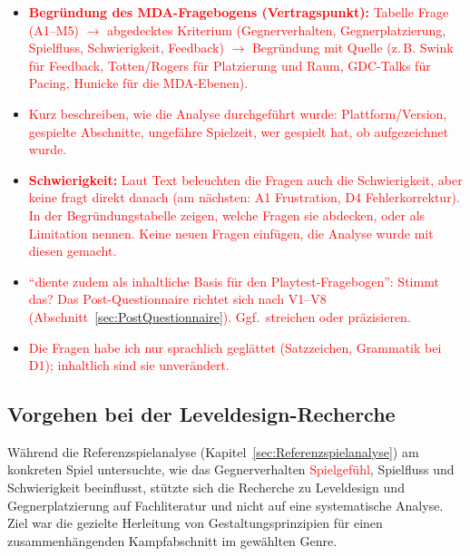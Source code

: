 \documentclass[../Main.tex]{subfiles}
\begin{document}
\begin{itemize}[leftmargin=1.5cm]
    \item \textcolor{red}{\textbf{Begründung des MDA-Fragebogens (Vertragspunkt):} Tabelle Frage (A1--M5) $\rightarrow$ abgedecktes Kriterium (Gegnerverhalten, Gegnerplatzierung, Spielfluss, Schwierigkeit, Feedback) $\rightarrow$ Begründung mit Quelle (z.\,B. Swink für Feedback, Totten/Rogers für Platzierung und Raum, GDC-Talks für Pacing, Hunicke für die MDA-Ebenen).}
    \item \textcolor{red}{Kurz beschreiben, wie die Analyse durchgeführt wurde: Plattform/Version, gespielte Abschnitte, ungefähre Spielzeit, wer gespielt hat, ob aufgezeichnet wurde.}
    \item \textcolor{red}{\textbf{Schwierigkeit:} Laut Text beleuchten die Fragen auch die Schwierigkeit, aber keine fragt direkt danach (am nächsten: A1 Frustration, D4 Fehlerkorrektur). In der Begründungstabelle zeigen, welche Fragen sie abdecken, oder als Limitation nennen. Keine neuen Fragen einfügen, die Analyse wurde mit diesen gemacht.}
    \item \textcolor{red}{\enquote{diente zudem als inhaltliche Basis für den Playtest-Fragebogen}: Stimmt das? Das Post-Questionnaire richtet sich nach V1--V8 (Abschnitt~\ref{sec:PostQuestionnaire}). Ggf.\ streichen oder präzisieren.}
    \item \textcolor{red}{Die Fragen habe ich nur sprachlich geglättet (Satzzeichen, Grammatik bei D1); inhaltlich sind sie unverändert.}
\end{itemize}

\subsection{Vorgehen bei der Leveldesign-Recherche} \label{sec:VorgehenLeveldesign}
Während die Referenzspielanalyse (Kapitel~\ref{sec:Referenzspielanalyse}) am konkreten Spiel untersuchte, wie das Gegnerverhalten \textcolor{red}{Spielgefühl}, Spielfluss und Schwierigkeit beeinflusst, stützte sich die Recherche zu Leveldesign und Gegnerplatzierung auf Fachliteratur und nicht auf eine systematische Analyse. Ziel war die gezielte Herleitung von Gestaltungsprinzipien für einen zusammenhängenden Kampfabschnitt im gewählten Genre.
\end{document}

